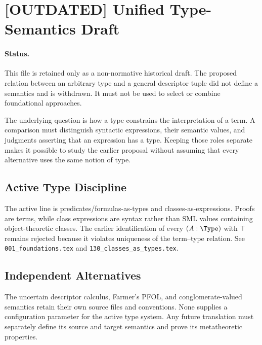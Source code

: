 \def\topic{[OUTDATED] Unified Type Semantics}

\section{[OUTDATED] Unified Type-Semantics Draft}

\paragraph{Status.}
This file is retained only as a non-normative historical draft. The proposed
relation between an arbitrary type and a general descriptor tuple did not
define a semantics and is withdrawn. It must not be used to select or combine
foundational approaches.

The underlying question is how a type constrains the interpretation of a
term. A comparison must distinguish syntactic expressions, their semantic
values, and judgments asserting that an expression has a type. Keeping
those roles separate makes it possible to study the earlier proposal
without assuming that every alternative uses the same notion of type.

\subsection{Active Type Discipline}
The active line is predicates/formulas-as-types and classes-as-expressions.
Proofs are terms, while class expressions are syntax rather than SML values
containing object-theoretic classes. The earlier identification of every
$(A:\Type)$ with $\top$ remains rejected because it violates uniqueness of the
term--type relation. See \texttt{001\_foundations.tex} and
\texttt{130\_classes\_as\_types.tex}.

\subsection{Independent Alternatives}
The uncertain descriptor calculus, Farmer's PFOL, and conglomerate-valued
semantics retain their own source files and conventions. None supplies a
configuration parameter for the active type system. Any future translation
must separately define its source and target semantics and prove its
metatheoretic properties.


